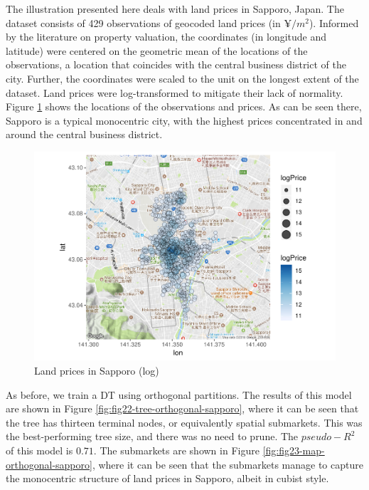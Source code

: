 \documentclass[]{elsarticle} %
\makeatletter
\def\maxwidth{\ifdim\Gin@nat@width>\linewidth\linewidth
\else\Gin@nat@width\fi}
\let\Oldincludegraphics\includegraphics
\renewcommand{\includegraphics}[1]{\Oldincludegraphics[width=\maxwidth]{#1}}
\makeatother
\begin{document}
The illustration presented here deals with land prices in Sapporo,
Japan. The dataset consists of 429 observations of geocoded land prices
(in \(\yen/m^2\)). Informed by the literature on property valuation, the
coordinates (in longitude and latitude) were centered on the geometric
mean of the locations of the observations, a location that coincides
with the central business district of the city. Further, the coordinates
were scaled to the unit on the longest extent of the dataset. Land
prices were log-transformed to mitigate their lack of normality. Figure
\ref{fig:fig21-map-sapporo} shows the locations of the observations and
prices. As can be seen there, Sapporo is a typical monocentric city,
with the highest prices concentrated in and around the central business
district.

\begin{figure}
\centering
\includegraphics{Trees_with_Base_Functions_v3_files/figure-latex/fig21-map-sapporo-1.pdf}
\caption{\label{fig:fig21-map-sapporo}Land prices in Sapporo (log)}
\end{figure}

As before, we train a DT using orthogonal partitions. The results of
this model are shown in Figure \ref{fig:fig22-tree-orthogonal-sapporo},
where it can be seen that the tree has thirteen terminal nodes, or
equivalently spatial submarkets. This was the best-performing tree size,
and there was no need to prune. The \(pseudo-R^2\) of this model is
\(0.71\). The submarkets are shown in Figure
\ref{fig:fig23-map-orthogonal-sapporo}, where it can be seen that the
submarkets manage to capture the monocentric structure of land prices in
Sapporo, albeit in cubist style.
\end{document}

